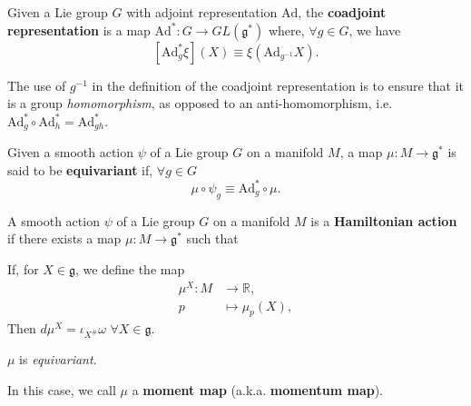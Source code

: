 \documentclass[11pt, final]{article}
\begin{document}
\begin{definition}
	Given a Lie group $G$ with adjoint representation $\mathrm{Ad}$, the \textbf{coadjoint representation} is a map $\mathrm{Ad}^*: G \to GL(\mathfrak{g}^*)$ where, $\forall g \in G$, we have
		\begin{equation}
			\left[ \mathrm{Ad}_g^* \xi \right] (X) \equiv \xi \left( \mathrm{Ad}_{g^{-1}} X \right).
		\end{equation}
\end{definition}
\begin{remark}
	The use of $g^{-1}$ in the definition of the coadjoint representation is to ensure that it is a group \textit{homomorphism}, as opposed to an anti-homomorphism, i.e. $\mathrm{Ad}_g^* \circ \mathrm{Ad}_h^* = \mathrm{Ad}_{gh}^*$.
\end{remark}


	
\begin{definition}[Equivariance]
	Given a smooth action $\psi$ of a Lie group $G$ on a manifold $M$, a map $\mu: M \to \mathfrak{g}^*$ is said to be \textbf{equivariant} if, $\forall g \in G$
		\begin{equation}
			\mu \circ \psi_g \equiv \mathrm{Ad}^*_g \circ \mu.
		\end{equation}
\end{definition}

\begin{definition}\label{def:HamiltonianAction}
	A smooth action $\psi$ of a Lie group $G$ on a manifold $M$ is a \textbf{Hamiltonian action} if there exists a map $\mu: M \to \mathfrak{g}^*$ such that
		\begin{ronumerate}
			\item If, for $X \in \mathfrak{g}$, we define the map
				\begin{align*}
					\mu^X:	M &\to \mathbb{R},\\
							p &\mapsto \mu_p (X),
				\end{align*}
			Then $d \mu^X = \iota_{X^\#} \omega$ $\forall X \in \mathfrak{g}$.
			\item $\mu$ is \textit{equivariant}.
		\end{ronumerate}
	In this case, we call $\mu$ a \textbf{moment map} (a.k.a. \textbf{momentum map}).
\end{definition}
\end{document}
